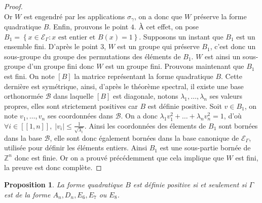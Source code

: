 \documentclass[a4paper,10pt]{article}
\newtheorem{prop}[]{Proposition}[section]
\newcommand{\EG}{\mathscr{E}_\Gamma}
\newcommand{\ent}[2]{[\![#1,#2]\!]}
\begin{document}
\begin{proof}
\[			\]
			Or $W$ est engendré par les applications $\sigma_\gamma$, on a donc que $W$ préserve la forme quadratique $B$. Enfin, prouvons le point $4$. À cet effet, on pose $B_1=\left\{ x\in\EG : x\text{ est entier et }B(x)=1 \right\}$. Supposons un instant que $B_1$ est un ensemble fini. D'après le point $3$, $W$ est un groupe qui préserve $B_1$, c'est donc un sous-groupe du groupe des permutations des éléments de $B_1$. $W$ est ainsi un sous-groupe d'un groupe fini donc $W$ est un groupe fini. Prouvons maintenant que $B_1$ est fini. On note $\left[ B \right]$ la matrice représentant la forme quadratique $B$. Cette dernière est symétrique, ainsi, d'après le théorème spectral, il existe une base orthonormée $\mathscr B$ dans laquelle $\left[ B \right]$ est diagonale, notons $\lambda_1,\dots,\lambda_n$ ses valeurs propres, elles sont strictement positives car $B$ est définie positive. Soit $v\in B_1$, on note $v_1,\dots,v_n$ ses coordonnées dans $\mathscr B$. On a donc $\lambda_1v_1^2+\dots+\lambda_nv_n^2=1$, d'où $\forall i \in\ent{1}{n},\;|v_i|\leq\frac{1}{\sqrt{\lambda_i}}$. Ainsi les coordonnées des élements de $B_1$ sont bornées dans la base $\mathscr B$, elle sont donc également bornées dans la base canonique de $\EG$, utilisée pour définir les éléments entiers. Ainsi $B_1$ est une sous-partie bornée de $\mathbb Z^n$ donc est finie. Or on a prouvé précédemment que cela implique que $W$ est fini, la preuve est donc complète.
		\end{proof}
		\begin{prop}
		La forme quadratique $B$ est définie positive si et seulement si $\Gamma$ est de la forme $A_n,D_n,E_6,E_7$ ou $E_8$.
		\end{prop}
\end{document}
